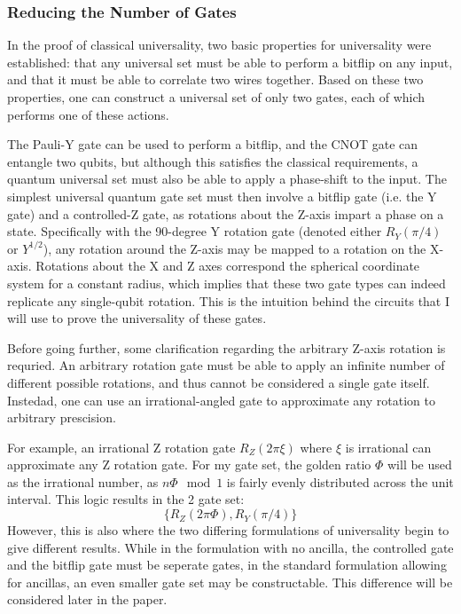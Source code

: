 \documentclass[12pt]{article}
\begin{document}
\subsubsection{Reducing the Number of Gates}
In the proof of classical universality, two basic properties for universality were established: that any universal set must be able to perform a bitflip on any input, and that it must be able to correlate two wires together. Based on these two properties, one can construct a universal set of only two gates, each of which performs one of these actions.

The Pauli-Y gate can be used to perform a bitflip, and the CNOT gate can entangle two qubits, but although this satisfies the classical requirements, a quantum universal set must also be able to apply a phase-shift to the input. The simplest universal quantum gate set must then involve a bitflip gate (i.e. the Y gate) and a controlled-Z gate, as rotations about the Z-axis impart a phase on a state. Specifically with the 90-degree Y rotation gate (denoted either $R_Y(\pi/4)$ or $Y^{1/2}$), any rotation around the Z-axis may be mapped to a rotation on the X-axis. Rotations about the X and Z axes correspond the spherical coordinate system for a constant radius, which implies that these two gate types can indeed replicate any single-qubit rotation. This is the intuition behind the circuits that I will use to prove the universality of these gates.

Before going further, some clarification regarding the arbitrary Z-axis rotation is requried. An arbitrary rotation gate must be able to apply an infinite number of different possible rotations, and thus cannot be considered a single gate itself. Instedad, one can use an irrational-angled gate to approximate any rotation to arbitrary prescision.

For example, an irrational Z rotation gate $R_Z(2\pi\xi)$ where $\xi$ is irrational can approximate any Z rotation gate. For my gate set, the golden ratio $\Phi$ will be used as the irrational number, as $n \Phi \mod 1$ is fairly evenly distributed across the unit interval.
This logic results in the 2 gate set:
$$\{R_Z(2\pi\Phi), R_Y(\pi/4)\}$$
However, this is also where the two differing formulations of universality begin to give different results. While in the formulation with no ancilla, the controlled gate and the bitflip gate must be seperate gates, in the standard formulation allowing for ancillas, an even smaller gate set may be constructable. This difference will be considered later in the paper.
\end{document}
